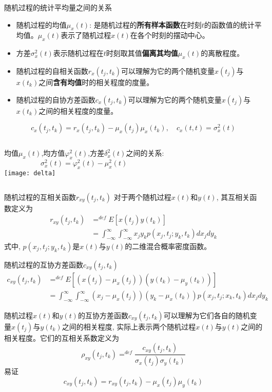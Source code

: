 \begin{frame}{随机过程的统计平均量之间的关系}
\small
\begin{itemize}
	\item 随机过程的均值$\mu_x(t)$: 是随机过程的\textbf{所有样本函数}在时刻$t$的函数值的统计平均值。$\mu_x(t)$表示了随机过程$x(t)$在各个时刻的摆动中心。
	\item 方差$\sigma_x^2(t)$表示随机过程在$t$时刻取其值\textbf{偏离其均值}$\mu_x(t)$的离散程度。
	\item 随机过程的自相关函数$r_x(t_j,t_k)$可以理解为它的两个随机变量$x(t_j)$与$x(t_k)$之间\textbf{含有均值}时的相关程度的度量。
	\item 随机过程的自协方差函数$c_x(t_j,t_k)$可以理解为它的两个随机变量$x(t_j)$与$x(t_k)$之间的相关程度的度量。
\end{itemize}
\[c_x(t_j,t_k)=r_x(t_j,t_k)-\mu_x(t_j)\mu_x(t_k),\quad c_x(t,t)=\sigma_x^2(t)\]
\begin{columns}
	均值$\mu_x(t)$,均方值$\varphi_x^2(t)$,方差$\delta_x^2(t)$之间的关系:
	\[\sigma_x^2(t)=\varphi_x^2(t)-\mu_x^2(t)\]
	\texttt{[image: delta]}
\end{columns}
\end{frame}

\begin{frame}
\begin{block}{随机过程的互相关函数$r_{xy}(t_j,t_k)$}
对于两个随机过程$x(t)$和$y(t)$, 其互相关函数定义为
\begin{align*}
r_{xy}(t_j,t_k) &\mathop{=}^{def}E[x(t_j)y(t_k)]\\
&=\int_{-\infty}^{\infty}\int_{-\infty}^{\infty}x_jy_kp(x_j,t_j;y_k,t_k)dx_jdy_k
\end{align*}
式中, $p(x_j,t_j;y_k,t_k)$是$x(t)$与$y(t)$的二维混合概率密度函数。
\end{block}
\end{frame}

\begin{frame}
\begin{block}{随机过程的互协方差函数$c_{xy}(t_j,t_k)$}
\begin{align*}
c_{xy}(t_j,t_k)&\mathop{=}^{def}E[(x(t_j)-\mu_x(t_j))(y(t_k)-\mu_y(t_k))]\\
&=\int_{-\infty}^{\infty}\int_{-\infty}^{\infty}(x_j-\mu_x(t_j))(y_k-\mu_x(t_k))p(x_j,t_j;x_k,t_k)dx_jdy_k
\end{align*}
\end{block}
随机过程$x(t)$和$y(t)$的互协方差函数$c_{xy}(t_j,t_k)$可以理解为它们各自的随机变量$x(t_j)$与$y(t_k)$之间的相关程度, 实际上表示两个随机过程$x(t)$与$y(t)$之间的相关程度。它们的互相关系数定义为
\[\rho_{xy}(t_j,t_k)\mathop{=}^{def}\frac{c_{xy}(t_j,t_k)}{\sigma_x(t_j)\sigma_y(t_k)}\]
易证
\[c_{xy}(t_j,t_k)=r_{xy}(t_j,t_k)-\mu_x(t_j)\mu_y(t_k)\]
\end{frame}

